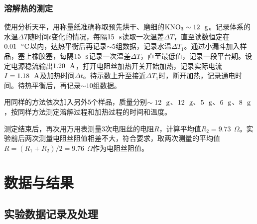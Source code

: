 \documentclass[12pt]{article}
\begin{document}
		
		
			\subsubsection{溶解热的测定}
			使用分析天平，用称量纸准确称取预先烘干、磨细的$\rm KNO_{3}\sim 12\ \ g$。记录体系的水温$\Delta T$随时间$t$变化的情况，每隔$15\ \ {\rm s}$读取一次温差$\Delta T$，直至读数恒定在$0.01\ \ {\rm ^{\circ}C}$以内，达热平衡后再记录$\sim 5$组数据，记录水温$\Delta T_{1}$。通过小漏斗加入样品，塞上橡胶塞，每隔$15\ \ {\rm s}$记录一次温差$\Delta T$，直至最低值，记录一段平台期。设定电源稳流输出$1.20\ \ {\rm A}$，打开电阻丝加热开关开始加热，记录实际电流$I=1.18\ \ {\rm A}$及加热时间$\Delta t$。待示数上升至接近$\Delta T_{1}$时，断开加热，记录通电时间。待热平衡后，再记录$\sim 10$组数据。\par 
			用同样的方法依次加入另外$5$个样品，质量分别$\sim 12\ \ {\rm g}$、$12\ \ {\rm g}$、$5\ \ {\rm g}$、$6\ \ {\rm g}$、$8\ \ {\rm g}$，按同样方法测定溶解过程和加热过程的时间和温度。\par 
			测定结束后，再次用万用表测量3次电阻丝的电阻$R$，计算平均值$R_{2}=9.73\ \ \Omega$。实验前后两次测量电阻丝阻值相差不大，符合要求，取两次测量的平均值$R=(R_{1}+R_{2})/2=9.76\ \ \Omega$作为电阻丝阻值。



 \section{数据与结果}
 \subsection{实验数据记录及处理}
\end{document}
